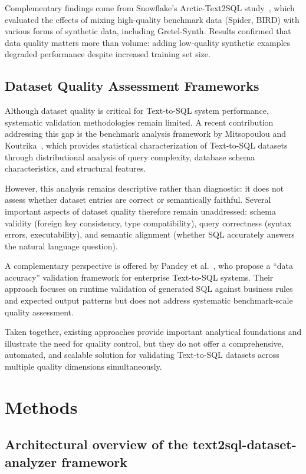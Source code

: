 \documentclass[]{einformatica}
\begin{document}
Complementary findings come from Snowflake's Arctic-Text2SQL study~\cite{arctic_text2sql}, which evaluated the effects of mixing high-quality benchmark data (Spider, BIRD) with various forms of synthetic data, including Gretel-Synth. Results confirmed that data quality matters more than volume: adding low-quality synthetic examples degraded performance despite increased training set size.

\subsection{Dataset Quality Assessment Frameworks}

Although dataset quality is critical for Text-to-SQL system performance, systematic validation methodologies remain limited. A recent contribution addressing this gap is the benchmark analysis framework by Mitsopoulou and Koutrika~\cite{mitsopoulou2025analysis}, which provides statistical characterization of Text-to-SQL datasets through distributional analysis of query complexity, database schema characteristics, and structural features.

However, this analysis remains descriptive rather than diagnostic: it does not assess whether dataset entries are correct or semantically faithful. Several important aspects of dataset quality therefore remain unaddressed: schema validity (foreign key consistency, type compatibility), query correctness (syntax errors, executability), and semantic alignment (whether SQL accurately answers the natural language question).

A complementary perspective is offered by Pandey et al.~\cite{pandey2024ensuring}, who propose a ``data accuracy'' validation framework for enterprise Text-to-SQL systems. Their approach focuses on runtime validation of generated SQL against business rules and expected output patterns but does not address systematic benchmark-scale quality assessment.

Taken together, existing approaches provide important analytical foundations and illustrate the need for quality control, but they do not offer a comprehensive, automated, and scalable solution for validating Text-to-SQL datasets across multiple quality dimensions simultaneously.

\section{Methods}\label{sec:Methods}

\subsection{Architectural overview of the text2sql-dataset-analyzer framework}
\end{document}
